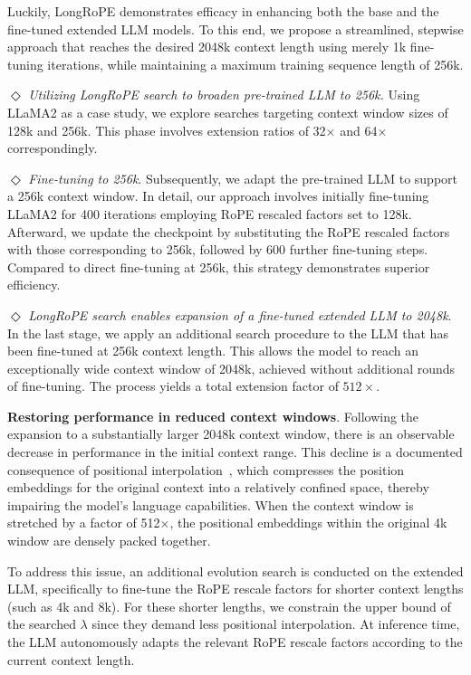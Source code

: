 Luckily, LongRoPE demonstrates efficacy in enhancing both the base and the fine-tuned extended LLM models. To this end, we propose a streamlined, stepwise approach that reaches the desired 2048k context length using merely 1k fine-tuning iterations, while maintaining a maximum training sequence length of 256k.

$\Diamond$ \textit{Utilizing LongRoPE search to broaden pre-trained LLM to 256k.} Using LLaMA2 as a case study, we explore searches targeting context window sizes of 128k and 256k. This phase involves extension ratios of 32$\times$ and 64$\times$ correspondingly.

$\Diamond$ \textit{Fine-tuning to 256k}. Subsequently, we adapt the pre-trained LLM to support a 256k context window. In detail, our approach involves initially fine-tuning LLaMA2 for 400 iterations employing RoPE rescaled factors set to 128k. Afterward, we update the checkpoint by substituting the RoPE rescaled factors with those corresponding to 256k, followed by 600 further fine-tuning steps. Compared to direct fine-tuning at 256k, this strategy demonstrates superior efficiency.

$\Diamond$ \textit{LongRoPE search enables expansion of a fine-tuned extended LLM to 2048k}. In the last stage, we apply an additional search procedure to the LLM that has been fine-tuned at 256k context length. This allows the model to reach an exceptionally wide context window of 2048k, achieved without additional rounds of fine-tuning. The process yields a total extension factor of $512\times$.

\textbf{Restoring performance in reduced context windows}.  Following the expansion to a substantially larger 2048k context window, there is an observable decrease in performance in the initial context range. This decline is a documented consequence of positional interpolation~\cite{pi}, which compresses the position embeddings for the original context into a relatively confined space, thereby impairing the model's language capabilities. When the context window is stretched by a factor of 512$\times$, the positional embeddings within the original 4k window are densely packed together.

To address this issue, an additional evolution search is conducted on the extended LLM, specifically to fine-tune the RoPE rescale factors for shorter context lengths (such as 4k and 8k). For these shorter lengths, we constrain the upper bound of the searched $\lambda$ since they demand less positional interpolation. At inference time, the LLM autonomously adapts the relevant RoPE rescale factors according to the current context length.

